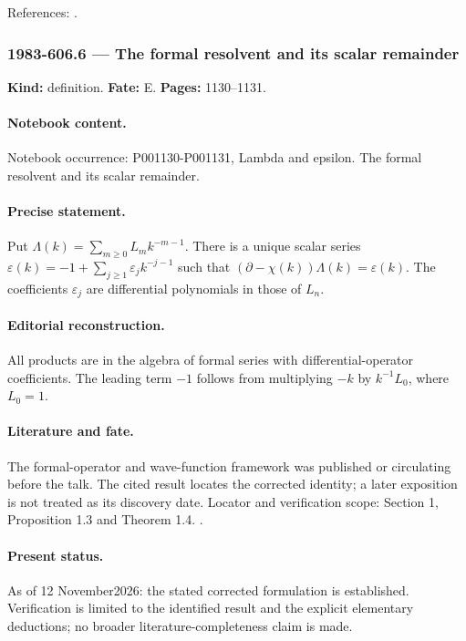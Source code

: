 \noindent References: \citep{cherednik1978differential,segalwilson1985loop}.\par

\subsubsection{1983-606.6 --- The formal resolvent and its scalar remainder}

\label{item:1983-606.6}

\noindent\textbf{Kind:} definition. \textbf{Fate:} E. \textbf{Pages:} 1130--1131.\par

\paragraph{Notebook content.} Notebook occurrence: P001130-P001131, Lambda and epsilon. The formal resolvent and its scalar remainder.

\paragraph{Precise statement.} Put \(\Lambda(k)=\sum_{m\ge0}L_mk^{-m-1}\). There is a unique scalar series \(\varepsilon(k)=-1+\sum_{j\ge1}\varepsilon_jk^{-j-1}\) such that \((\partial-\chi(k))\Lambda(k)=\varepsilon(k)\). The coefficients \(\varepsilon_j\) are differential polynomials in those of \(L_n\).

\paragraph{Editorial reconstruction.} All products are in the algebra of formal series with differential-operator coefficients. The leading term \(-1\) follows from multiplying \(-k\) by \(k^{-1}L_0\), where \(L_0=1\).

\paragraph{Literature and fate.} The formal-operator and wave-function framework was published or circulating before the talk. The cited result locates the corrected identity; a later exposition is not treated as its discovery date. Locator and verification scope: Section 1, Proposition 1.3 and Theorem 1.4. \cite{cherednik1978differential}.

\paragraph{Present status.} As of 12 November2026: the stated corrected formulation is established. Verification is limited to the identified result and the explicit elementary deductions; no broader literature-completeness claim is made.

